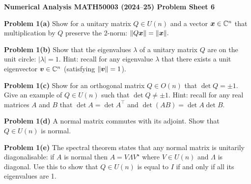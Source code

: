 \documentclass[12pt,a4paper]{article}
\def\endash{–}
\def\bbC{ {\mathbb C} }
\def\x{ {\vc x} }
\def\v{ {\vc v} }
\begin{document}
\textbf{Numerical Analysis MATH50003 (2024\ensuremath{\endash}25) Problem Sheet 6}

\textbf{Problem 1(a)} Show for a unitary matrix $Q \ensuremath{\in} U(n)$ and a vector $\ensuremath{\bm{\x}} \ensuremath{\in} \ensuremath{\bbC}^n$ that multiplication by $Q$ preserve the 2-norm: $\|Q \ensuremath{\bm{\x}}\| = \|\ensuremath{\bm{\x}}\|.$

\textbf{Problem 1(b)} Show that the eigenvalues $\ensuremath{\lambda}$ of a unitary matrix $Q$ are on the unit circle: $|\ensuremath{\lambda}| = 1$. Hint: recall for any eigenvalue $\ensuremath{\lambda}$ that there exists a unit eigenvector $\ensuremath{\bm{\v}} \ensuremath{\in} \ensuremath{\bbC}^n$ (satisfying $\| \ensuremath{\bm{\v}} \| = 1$). 

\textbf{Problem 1(c)} Show for an orthogonal matrix $Q \ensuremath{\in} O(n)$ that $\det Q = \ensuremath{\pm}1$. Give an example of $Q \ensuremath{\in} U(n)$ such that $\det Q \ensuremath{\neq} \ensuremath{\pm}1$. Hint: recall for any real matrices $A$ and $B$ that $\det A = \det A^\ensuremath{\top}$ and $\det(AB) = \det A \det B$.

\textbf{Problem 1(d)} A normal matrix commutes with its adjoint. Show that $Q \ensuremath{\in} U(n)$ is normal.

\textbf{Problem 1(e)}  The spectral theorem states that any normal matrix is unitarily diagonalisable: if $A$ is normal then $A = V \ensuremath{\Lambda} V^\ensuremath{\star}$ where $V \ensuremath{\in} U(n)$ and $\ensuremath{\Lambda}$ is diagonal. Use this to show that  $Q \ensuremath{\in} U(n)$ is equal to $I$ if and only if all its eigenvalues are 1.
\end{document}
